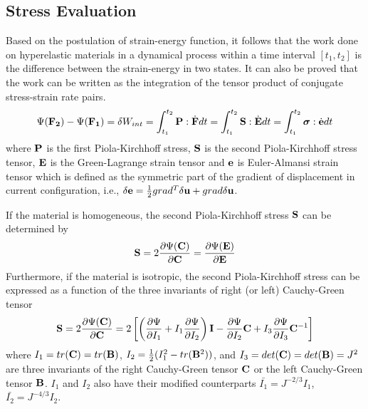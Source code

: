 \subsection{Stress Evaluation}
Based on the postulation of strain-energy function, it follows that the work done on hyperelastic materials in a dynamical process within a time interval $[t_1, t_2]$ is the difference between the strain-energy in two states. It can also be proved that the work can be written as the integration of the tensor product of conjugate stress-strain rate pairs.
\begin{equation}
\Psi({\bold{F_2}}) - \Psi({\bold{F_1}}) = \delta{W_{int}} = \int_{t_1}^{t_2}\bold{P}:\dot{\bold{F}}dt = \int_{t_1}^{t_2}\bold{S}:\dot{\bold{E}}dt = 
\int_{t_1}^{t_2}\boldsymbol{\sigma}:\dot{\bold{e}}dt
\end{equation}
where $\bold{P}$ is the first Piola-Kirchhoff stress, $\bold{S}$ is the second Piola-Kirchhoff stress tensor, $\bold{E}$ is the Green-Lagrange strain tensor and $\bold{e}$ is Euler-Almansi strain tensor which is defined as the symmetric part of the gradient of displacement in current configuration, i.e., $\delta\bold{e} = \frac{1}{2}{ grad^T\delta\bold{u} + grad\delta\bold{u}}$.

If the material is homogeneous, the second Piola-Kirchhoff stress $\bold{S}$ can be determined by 
\begin{equation}
\bold{S} = 2\frac{\partial\Psi(\bold{C})}{\partial{\bold{C}}} = \frac{\partial\Psi(\bold{E})}{\partial{\bold{E}}}
\end{equation}
Furthermore, if the material is isotropic, the second Piola-Kirchhoff stress can be expressed as a function of the three invariants of right (or left) Cauchy-Green tensor
\begin{equation} \label{PK2}
\bold{S} = 2\frac{\partial\Psi({\bold{C})}}{\partial{\bold{C}}} = 2\left[\left( \frac{\partial\Psi}{\partial{I_1}} + I_1 \frac{\partial\Psi}{\partial{I_2}} \right)\bold{I} -  \frac{\partial\Psi}{\partial{I_2}}\bold{C} + I_3 \frac{\partial\Psi}{\partial{I_3}}{\bold{C}}^{-1} \right]
\end{equation}
where $I_1 = tr(\bold{C}) = tr(\bold{B})$, $I_2 = \frac{1}{2}(I_1^2 - tr(\bold{B}^2))$, and $I_3 = det(\bold{C}) = det(\bold{B}) = J^2$ are three invariants of the right Cauchy-Green tensor $\bold{C}$ or the left Cauchy-Green tensor $\bold{B}$. $I_1$ and $I_2$ also have their modified counterparts $\bar{I_1} = J^{-2/3}I_1$, $\bar{I_2} = J^{-4/3}I_2$.

